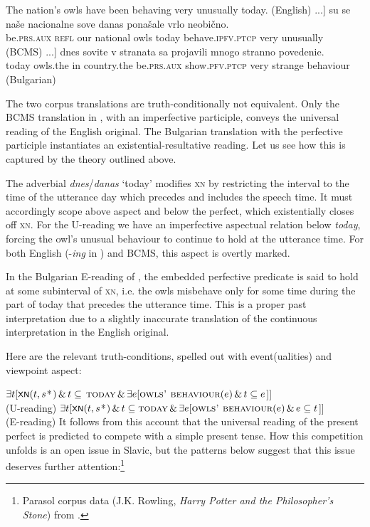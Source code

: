 \documentclass[output=paper,colorlinks,citecolor=brown]{langscibook}
\begin{document}
\ea\ea \label{owl2}  The nation's owls have been behaving very unusually today. \hfill (English)   
\ex\label{owl-sc}\gll {[}...] su se naše nacionalne sove danas ponašale vrlo neobično. \\ {} be.\textsc{prs}.\textsc{aux} \textsc{refl} our national owls today behave.\textsc{ipfv}.\textsc{ptcp} very unusually  \\ \hfill (BCMS)
\ex\label{owl-bu}\gll {[}...] dnes sovite v stranata sa projavili mnogo stranno povedenie. \\  {} today owls.the in country.the be.\textsc{prs}.\textsc{aux} show.\textsc{pfv}.\textsc{ptcp} very strange  behaviour \\ \hfill (Bulgarian)
\z\z

\noindent The two corpus translations are truth-conditionally not equivalent. Only the BCMS translation in , with an imperfective participle, conveys the universal reading of the English original. The Bulgarian translation  with the perfective participle instantiates an existential-resultative reading.
Let us see how this is captured by the theory outlined above.

The adverbial \textit{dnes}/\textit{danas} `today' modifies \textsc{xn} by restricting the interval to the time of the utterance day which precedes and includes the speech time.  It must accordingly scope above aspect and below the perfect, which existentially closes off \textsc{xn}. For the U-reading we have an imperfective aspectual relation below {\textit{today}}, forcing  the owl's unusual behaviour to continue to hold at the utterance time. For both English (-{\textit{ing}} in ) and BCMS, this aspect is overtly marked. 

In the Bulgarian E-reading of ,  the embedded perfective predicate is said to hold at some subinterval of \textsc{xn}, i.e. the owls misbehave only for some time during the part of today that precedes the utterance time. This is a proper past interpretation due to a slightly inaccurate translation of the continuous interpretation in the English original.


 Here are the relevant truth-conditions, spelled out with event(ualities) and viewpoint aspect:

\ea\ea 
$  \exists  t  [\cnst{xn}(t,s$*$) \, \& \, t \subseteq \,\textsc{today} \,\&\, \exists e[\textsc{owls' behaviour}(e) \,   \& \, t \subseteq e$]]   \\\hfill (U-reading)
\ex 
$  \exists  t   [\cnst{xn}(t,s$*$) \, \& \, t \subseteq\textsc{today} \,\&\, \exists e[\textsc{owls' behaviour}(e) \,   \& \, e \subseteq t$]]  \\\hfill (E-reading)
\z\z
It follows from this account that the universal reading of the present perfect is predicted to compete with a simple present tense. 
How this competition unfolds is an open issue in Slavic, but the patterns below suggest that this issue deserves further attention:\footnote{Parasol corpus data (J.K. Rowling, \textit{Harry Potter and the Philosopher's Stone}) from \citet{gronn_stechow2020}.}
\end{document}
